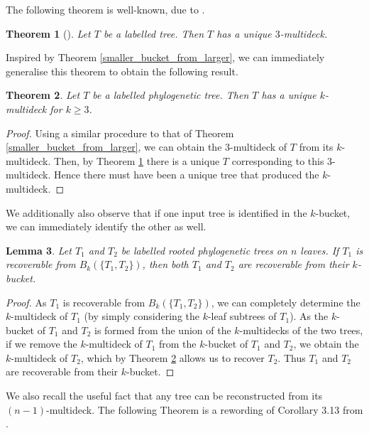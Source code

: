 \documentclass[12pt]{article}
\newtheorem{Theorem}{Theorem}[section]
\newtheorem{Lemma}[Theorem]{Lemma}
\theoremstyle{definition}
\begin{document}
The following theorem is well-known, due to \cite{aho1981inferring}.

\begin{Theorem}[\cite{aho1981inferring}]\label{t:3-recoverable}
    Let $T$ be a labelled tree. Then $T$ has a unique $3$-multideck.
\end{Theorem}

Inspired by Theorem \ref{smaller_bucket_from_larger}, we can immediately generalise this theorem to obtain the following result.

\begin{Theorem}\label{t:one_tree_labelled_recovery}
    Let $T$ be a labelled phylogenetic tree. Then $T$ has a unique $k$-multideck for $k \geq 3$.
\end{Theorem}

\begin{proof}
    Using a similar procedure to that of Theorem \ref{smaller_bucket_from_larger}, we can obtain the $3$-multideck of $T$ from its $k$-multideck. Then, by Theorem \ref{t:3-recoverable} there is a unique $T$ corresponding to this $3$-multideck. Hence there must have been a unique tree that produced the $k$-multideck.
\end{proof}

We additionally also observe that if one input tree is identified in the $k$-bucket, we can immediately identify the other as well.

\begin{Lemma}\label{labelled_buckets_one_from_other}
    Let $T_1$ and $T_2$ be labelled rooted phylogenetic trees on $n$ leaves. If $T_1$ is recoverable from $B_k(\{T_1, T_2\})$, then both $T_1$ and $T_2$ are recoverable from their $k$-bucket.
\end{Lemma}

\begin{proof}
    As $T_1$ is recoverable from $B_k(\{T_1, T_2\})$, we can completely determine the $k$-multideck of $T_1$ (by simply considering the $k$-leaf subtrees of $T_1$). As the $k$-bucket of $T_1$ and $T_2$ is formed from the union of the $k$-multidecks of the two trees, if we remove the $k$-multideck of $T_1$ from the $k$-bucket of $T_1$ and $T_2$, we obtain the $k$-multideck of $T_2$, which by Theorem \ref{t:one_tree_labelled_recovery} allows us to recover $T_2$. Thus $T_1$ and $T_2$ are recoverable from their $k$-bucket.
\end{proof}

We also recall the useful fact that any tree can be reconstructed from its $(n-1)$-multideck. The following Theorem is a rewording of Corollary 3.13 from \cite{Decks_of_rooted_binary_trees}.
\end{document}
